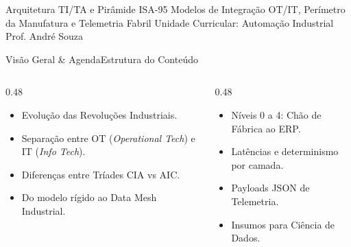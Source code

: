 
\senaicover
  {Arquitetura TI/TA e Pirâmide ISA-95}
  {Modelos de Integração OT/IT, Perímetro da Manufatura e Telemetria Fabril}
  {Unidade Curricular: Automação Industrial}
  {Prof. André Souza}

\begin{senaiframe}{Visão Geral \& Agenda}{Estrutura do Conteúdo}
  \begin{columns}[t]
    \begin{column}{0.48\textwidth}
      \begin{tcolorbox}[senaibluecard, title={1. Arquitetura TI/TA}]
        \begin{itemize}
          \item Evolução das Revoluções Industriais.
          \item Separação entre OT (\textit{Operational Tech}) e IT (\textit{Info Tech}).
        \end{itemize}
      \end{tcolorbox}
      \vspace{4pt}
      \begin{tcolorbox}[senaiambercard, title={3. Convergência TI/TA}]
        \begin{itemize}
          \item Diferenças entre Tríades CIA vs AIC.
          \item Do modelo rígido ao Data Mesh Industrial.
        \end{itemize}
      \end{tcolorbox}
    \end{column}
    \begin{column}{0.48\textwidth}
      \begin{tcolorbox}[senairedcard, title={2. A Norma ISA-95}]
        \begin{itemize}
          \item Níveis 0 a 4: Chão de Fábrica ao ERP.
          \item Latências e determinismo por camada.
        \end{itemize}
      \end{tcolorbox}
      \vspace{4pt}
      \begin{tcolorbox}[senaigreencard, title={4. Ecossistema Smart N1}]
        \begin{itemize}
          \item Payloads JSON de Telemetria.
          \item Insumos para Ciência de Dados.
        \end{itemize}
      \end{tcolorbox}
    \end{column}
  \end{columns}
\end{senaiframe}

